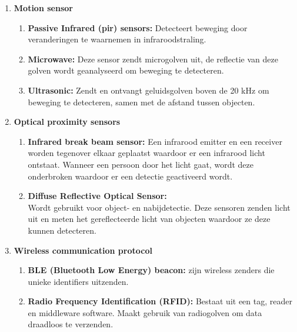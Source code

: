 \begin{enumerate}
    \item \textbf{Motion sensor}
    \begin{enumerate}
        \item \textbf{Passive Infrared (\gls{pir}) sensors:} Detecteert beweging door veranderingen te waarnemen in infraroodstraling.
        \item \textbf{Microwave:} Deze sensor zendt microgolven uit, de reflectie van deze golven wordt geanalyseerd om beweging te detecteren.
        \item \textbf{Ultrasonic:} Zendt en ontvangt geluidsgolven boven de 20 kHz om beweging te detecteren, samen met de afstand tussen objecten.
    \end{enumerate}
    
    
    \item \textbf{Optical proximity sensors}
    \begin{enumerate}
        \item \textbf{Infrared break beam sensor:} Een infrarood emitter en een receiver worden tegenover elkaar geplaatst waardoor er een infrarood licht ontstaat. Wanneer een persoon door het licht gaat, wordt deze onderbroken waardoor er een detectie geactiveerd wordt.
        \item \textbf{Diffuse Reflective Optical Sensor:} \\ Wordt gebruikt voor object- en nabijdetectie. Deze sensoren zenden licht uit en meten het gereflecteerde licht van objecten waardoor ze deze kunnen detecteren.
    \end{enumerate}
    
    \item \textbf{Wireless communication protocol}
    \begin{enumerate}
        \item \textbf{BLE (Bluetooth Low Energy) beacon:} zijn wireless zenders die unieke identifiers uitzenden.
        \item \textbf{Radio Frequency Identification (RFID):} Bestaat uit een tag, reader en middleware software. Maakt gebruik van radiogolven om data draadloos te verzenden.
    \end{enumerate}
    

\end{enumerate}

